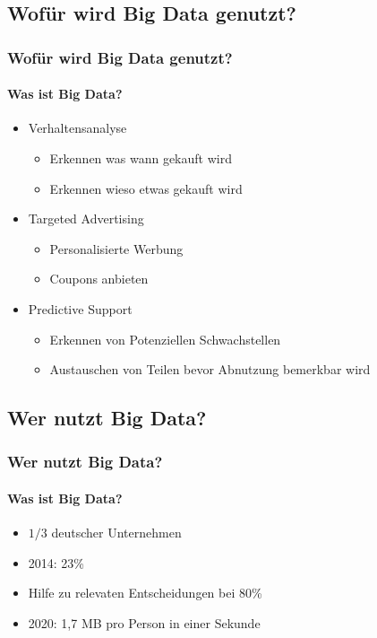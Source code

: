 \documentclass[10pt,a4paper]{beamer}
\begin{document}
\subsection{Wofür wird Big Data genutzt?}
\begin{frame}
\frametitle{Wofür wird Big Data genutzt?}
\framesubtitle{Was ist Big Data?}
\begin{itemize}
\item Verhaltensanalyse
	\begin{itemize}
	\item Erkennen was wann gekauft wird
	\item Erkennen wieso etwas gekauft wird
	\end{itemize} \pause
\item Targeted Advertising
	\begin{itemize}
	\item Personalisierte Werbung
	\item Coupons anbieten 
	\end{itemize} \pause
\item Predictive Support
	\begin{itemize}
	\item Erkennen von Potenziellen Schwachstellen
	\item Austauschen von Teilen bevor Abnutzung bemerkbar wird
	\end{itemize}
\end{itemize}
\end{frame}

\subsection{Wer nutzt Big Data?}
\begin{frame}
\frametitle{Wer nutzt Big Data?}
\framesubtitle{Was ist Big Data?}
\begin{itemize}
\item \( 1/3\) deutscher Unternehmen \pause
\item 2014: 23\% \pause
\item Hilfe zu relevaten Entscheidungen bei 80\% \pause
\item 2020: 1,7 MB pro Person in einer Sekunde 
\end{itemize}
\end{frame}
\end{document}
